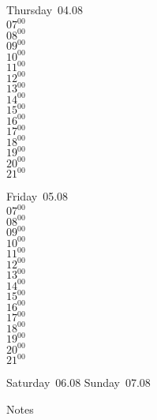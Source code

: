 \documentclass[11pt,a4paper]{book}\usepackage[]{graphicx}\usepackage[]{color}
\begin{document}
\clearpage
\begin{headerbox}
\end{headerbox}
\begin{weekdaybox}
  Thursday~04.08\\
  { 
  \vfill
  $07^{00}$\\
$08^{00}$\\
$09^{00}$\\
$10^{00}$\\
$11^{00}$\\
$12^{00}$\\
$13^{00}$\\
$14^{00}$\\
$15^{00}$\\
$16^{00}$\\
$17^{00}$\\
$18^{00}$\\
$19^{00}$\\
$20^{00}$\\
$21^{00}$\\
  }
\end{weekdaybox} 
\begin{weekdaybox}
  Friday~05.08\\
  { 
  \vfill
  $07^{00}$\\
$08^{00}$\\
$09^{00}$\\
$10^{00}$\\
$11^{00}$\\
$12^{00}$\\
$13^{00}$\\
$14^{00}$\\
$15^{00}$\\
$16^{00}$\\
$17^{00}$\\
$18^{00}$\\
$19^{00}$\\
$20^{00}$\\
$21^{00}$\\
  }
\end{weekdaybox}
\begin{weekendbox}
  Saturday~06.08
  \tcblower
  Sunday~07.08
\end{weekendbox} %
\begin{notebox}
  Notes
\end{notebox}
\clearpage
\end{document}
